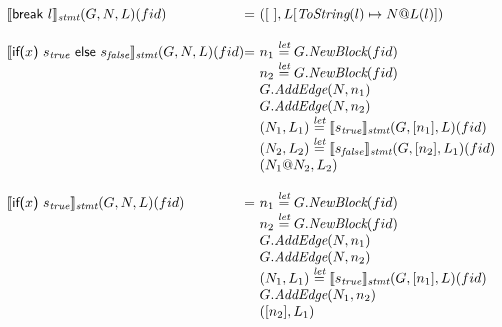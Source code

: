 \[\begin{array}{l@{}l@{~}l}
\transfun{\irbreak{l}}_{\emph{stmt}}(G,N,L)(fid) & = &
	([\ ], L[\ToString(l) \mapsto N@L(l)])\\
	& & \\

\transfun{\irifelse{x}{s_{\emph{true}}}{s_{\emph{false}}}}_{\emph{stmt}}(G,N,L)(fid) & = &
	n_1 \letval G.\emph{NewBlock}(fid)\\
	& & n_2 \letval G.\emph{NewBlock}(fid)\\
	& & G.\emph{AddEdge}(N,n_1)\\
	& & G.\emph{AddEdge}(N,n_2)\\
	& & (N_1,L_1) \letval \transfun{s_{\emph{true}}}_{\emph{stmt}}(G,[n_1],L)(fid)\\
	& & (N_2,L_2) \letval \transfun{s_{\emph{false}}}_{\emph{stmt}}(G,[n_2],L_1)(fid)\\
	& & (N_1@N_2,L_2)\\
	& & \\
	
\transfun{\irif{x}{s_{\emph{true}}}{}}_{\emph{stmt}}(G,N,L)(fid) & = &
	n_1 \letval G.\emph{NewBlock}(fid)\\
	& & n_2 \letval G.\emph{NewBlock}(fid)\\
	& & G.\emph{AddEdge}(N,n_1)\\
	& & G.\emph{AddEdge}(N,n_2)\\
	& & (N_1,L_1) \letval \transfun{s_{\emph{true}}}_{\emph{stmt}}(G,[n_1],L)(fid)\\
	& & G.\emph{AddEdge}(N_1,n_2)\\
	& & ([n_2],L_1)\\
	& & \\
\end{array}
\]

